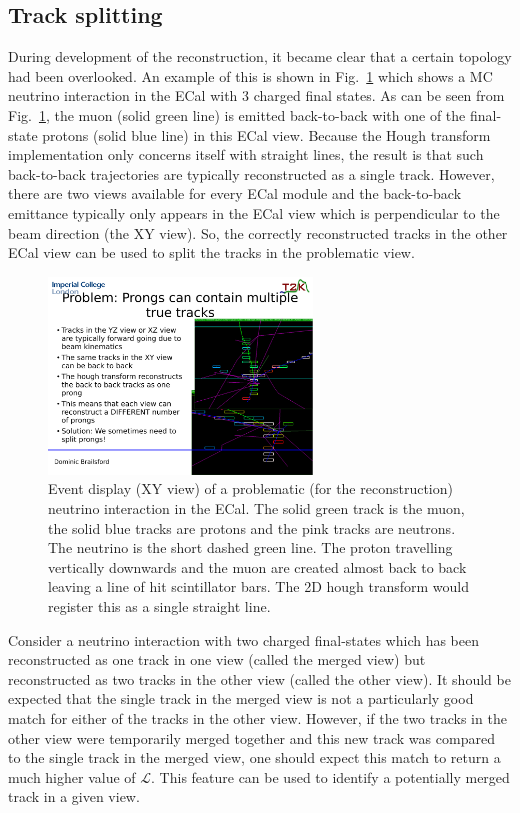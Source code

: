 \subsection{Track splitting}
\label{subsec:TrackSplitting}
During development of the reconstruction, it became clear that a certain topology had been overlooked.  An example of this is shown in Fig.~\ref{fig:MergedTrackEventDisplay} which shows a MC neutrino interaction in the ECal with 3 charged final states.  As can be seen from Fig.~\ref{fig:MergedTrackEventDisplay}, the muon (solid green line) is emitted back-to-back with one of the final-state protons (solid blue line) in this ECal view.  Because the Hough transform implementation only concerns itself with straight lines, the result is that such back-to-back trajectories are typically reconstructed as a single track.  However, there are two views available for every ECal module and the back-to-back emittance typically only appears in the ECal view which is perpendicular to the beam direction (the XY view).  So, the correctly reconstructed tracks in the other ECal view can be used to split the tracks in the problematic view.  
\begin{figure}
  \centering
  \includegraphics[width=7cm]{images/hough_3d_matching/MergedTrackEventDisplay.pdf}
  \caption{Event display (XY view) of a problematic (for the reconstruction) neutrino interaction in the ECal.  The solid green track is the muon, the solid blue tracks are protons and the pink tracks are neutrons.  The neutrino is the short dashed green line.  The proton travelling vertically downwards and the muon are created almost back to back leaving a line of hit scintillator bars.  The 2D hough transform would register this as a single straight line.}
  \label{fig:MergedTrackEventDisplay}
\end{figure}
\newline
\newline
Consider a neutrino interaction with two charged final-states which has been reconstructed as one track in one view (called the merged view) but reconstructed as two tracks in the other view (called the other view).  It should be expected that the single track in the merged view is not a particularly good match for either of the tracks in the other view.  However, if the two tracks in the other view were temporarily merged together and this new track was compared to the single track in the merged view, one should expect this match to return a much higher value of $\mathcal{L}$.  This feature can be used to identify a potentially merged track in a given view.
